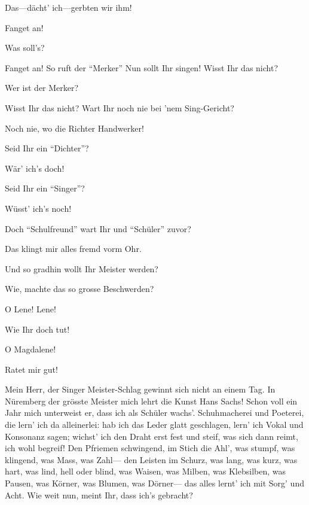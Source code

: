\begin{drama}

Das---dächt' ich---gerbten wir ihm!


\Davidspeaks
{}
Fanget an!

\Waltherspeaks
{}
Was soll's?

\Davidspeaks
{}

Fanget an! So ruft der ``Merker''
Nun sollt Ihr singen! Wisst Ihr das nicht?

\Waltherspeaks
Wer ist der Merker?

\Davidspeaks
Wisst Ihr das nicht? Wart Ihr noch nie bei 'nem Sing-Gericht?

\Waltherspeaks
Noch nie, wo die Richter Handwerker!

\Davidspeaks
Seid Ihr ein ``Dichter''?

\Waltherspeaks
Wär' ich's doch!

\Davidspeaks
Seid Ihr ein ``Singer''?

\Waltherspeaks
Wüsst' ich's noch!

\Davidspeaks
Doch ``Schulfreund'' wart Ihr und ``Schüler'' zuvor?

\Waltherspeaks
Das klingt mir alles fremd vorm Ohr.

\Davidspeaks
Und so gradhin wollt Ihr Meister werden?

\Waltherspeaks
Wie, machte das so grosse Beschwerden?

\Davidspeaks
O Lene! Lene!

\Waltherspeaks
Wie Ihr doch tut!

\Davidspeaks
O Magdalene!

\Waltherspeaks
Ratet mir gut!

\Davidspeaks
{}

Mein Herr, der Singer Meister-Schlag
gewinnt sich nicht an einem Tag.
In Nüremberg der grösste Meister
mich lehrt die Kunst Hans Sachs!
Schon voll ein Jahr mich unterweist er,
dass ich als Schüler wachs'.
Schuhmacherei und Poeterei,
die lern' ich da alleinerlei:
hab ich das Leder glatt geschlagen,
lern' ich Vokal und Konsonanz sagen;
wichst' ich den Draht erst fest und steif,
was sich dann reimt, ich wohl begreif!
Den Pfriemen schwingend,
im Stich die Ahl',
was stumpf, was klingend,
was Mass, was Zahl---
den Leisten im Schurz, was lang, was kurz,
was hart, was lind, hell oder blind,
was Waisen, was Milben, was Klebsilben,
was Pausen, was Körner, was Blumen, was Dörner---
das alles lernt' ich mit Sorg' und Acht.
Wie weit nun, meint Ihr, dass ich's gebracht?


\end{drama}
